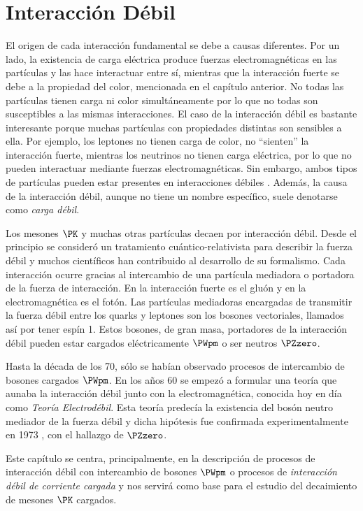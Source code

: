 \chapter{Interacción Débil}\label{cap:weak_int}
El origen de cada interacción fundamental se debe a causas diferentes. Por un lado, la existencia de carga eléctrica produce fuerzas electromagnéticas en las partículas y las hace interactuar entre sí, mientras que la interacción fuerte se debe a la propiedad del color, mencionada en el capítulo anterior. No todas las partículas tienen carga ni color simultáneamente por lo que no todas son susceptibles a las mismas interacciones. El caso de la interacción débil es bastante interesante porque muchas partículas con propiedades distintas son sensibles a ella. Por ejemplo, los leptones no tienen carga de color, no ``sienten'' la interacción fuerte, mientras los neutrinos no tienen carga eléctrica, por lo que no pueden interactuar mediante fuerzas electromagnéticas. Sin embargo, ambos tipos de partículas pueden estar presentes en interacciones débiles \cite{Griffiths2008}. Además, la causa de la interacción débil, aunque no tiene un nombre específico, suele denotarse como \textit{carga débil}.

Los mesones $\PK$ y muchas otras partículas decaen por interacción débil. Desde el principio se consideró un tratamiento cuántico-relativista para describir la fuerza débil y muchos científicos han contribuido al desarrollo de su formalismo. Cada interacción ocurre gracias al intercambio de una partícula mediadora o portadora de la fuerza de interacción. En la interacción fuerte es el gluón y en la electromagnética es el fotón. Las partículas mediadoras encargadas de transmitir la fuerza débil entre los quarks y leptones son los bosones vectoriales, llamados así por tener espín 1. Estos bosones, de gran masa, portadores de la interacción débil pueden estar cargados eléctricamente $\PWpm$ o ser neutros $\PZzero$. 

Hasta la década de los 70, sólo se habían observado procesos de intercambio de bosones cargados $\PWpm$. En los años 60 se empezó a formular una teoría que aunaba la interacción débil junto con la electromagnética, conocida hoy en día como \textit{Teoría Electrodébil}. Esta teoría predecía la existencia del bosón neutro mediador de la fuerza débil y dicha hipótesis fue confirmada experimentalmente en 1973 \cite{BrianM}, con el hallazgo de $\PZzero$.

Este capítulo se centra, principalmente, en la descripción de procesos de interacción débil con intercambio de bosones $\PWpm$ o procesos de \textit{interacción débil de corriente cargada} y nos servirá como base para el estudio del decaimiento de mesones $\PK$ cargados.

